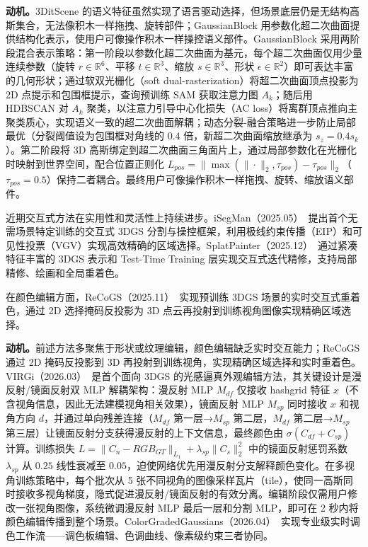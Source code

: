 \textbf{动机。}3DitScene 的语义特征虽然实现了语言驱动选择，但场景底层仍是无结构高斯集合，无法像积木一样拖拽、旋转部件；GaussianBlock 用参数化超二次曲面提供结构化表示，使用户可像操作积木一样操控语义部件。GaussianBlock 采用两阶段混合表示策略：第一阶段以参数化超二次曲面为基元，每个超二次曲面仅用少量连续参数（旋转 $r \in \mathbb{R}^6$、平移 $t \in \mathbb{R}^3$、缩放 $s \in \mathbb{R}^3$、形状 $\epsilon \in \mathbb{R}^2$）即可表达丰富的几何形状；通过软双光栅化（soft dual-rasterization）将超二次曲面顶点投影为 2D 点提示和包围框提示，查询预训练 SAM 获取注意力图 $A_k$；随后用 HDBSCAN 对 $A_k$ 聚类，以注意力引导中心化损失（AC loss）将离群顶点推向主聚类质心，实现语义一致的超二次曲面解耦；动态分裂-融合策略进一步防止局部最优（分裂阈值设为包围框对角线的 $0.4$ 倍，新超二次曲面缩放继承为 $s_z = 0.4s_k$）。第二阶段将 3D 高斯绑定到超二次曲面三角面片上，通过局部参数化在光栅化时映射到世界空间，配合位置正则化 $L_{pos} = \|\max(\|\cdot\|_2, \tau_{pos}) - \tau_{pos}\|_2$（$\tau_{pos}=0.5$）保持二者耦合。最终用户可像操作积木一样拖拽、旋转、缩放语义部件。

近期交互式方法在实用性和灵活性上持续进步。iSegMan（2025.05）~\cite{2505_11934}提出首个无需场景特定训练的交互式 3DGS 分割与操控框架，利用极线约束传播（EIP）和可见性投票（VGV）实现高效精确的区域选择。SplatPainter（2025.12）~\cite{2512_05354}通过紧凑特征丰富的 3DGS 表示和 Test-Time Training 层实现交互式迭代精修，支持局部精修、绘画和全局重着色。

在颜色编辑方面，ReCoGS（2025.11）~\cite{2511_18441}实现预训练 3DGS 场景的实时交互式重着色，通过 2D 选择掩码反投影为 3D 点云再投射到训练视角图像实现精确区域选择。

\textbf{动机。}前述方法多聚焦于形状或纹理编辑，颜色编辑缺乏实时交互能力；ReCoGS 通过 2D 掩码反投影到 3D 再投射到训练视角，实现精确区域选择和实时重着色。VIRGi（2026.03）~\cite{2603_02986}是首个面向 3DGS 的光感逼真外观编辑方法，其关键设计是漫反射/镜面反射双 MLP 解耦架构：漫反射 MLP $M_{df}$ 仅接收 hashgrid 特征 $x$（不含视角信息，因此无法建模视角相关效果），镜面反射 MLP $M_{sp}$ 同时接收 $x$ 和视角方向 $d$，并通过单向残差连接（$M_{df}$ 第一层→$M_{sp}$ 第二层，$M_{df}$ 第二层→$M_{sp}$ 第三层）让镜面反射分支获得漫反射的上下文信息，最终颜色由 $\sigma(C_{df} + C_{sp})$ 计算。训练损失 $L = \|C_n - RGB_{GT}\|_{L_1} + \lambda_{sp} \|C_s\|^2_2$ 中的镜面反射惩罚系数 $\lambda_{sp}$ 从 $0.25$ 线性衰减至 $0.05$，迫使网络优先用漫反射分支解释颜色变化。在多视角训练策略中，每个批次从 5 张不同视角的图像采样瓦片（tile），使同一高斯同时接收多视角梯度，隐式促进漫反射/镜面反射的有效分离。编辑阶段仅需用户修改一张视角图像，系统微调漫反射 MLP 最后一层和分割 MLP，即可在 2 秒内将颜色编辑传播到整个场景。ColorGradedGaussians（2026.04）~\cite{2604_01551}实现专业级实时调色工作流——调色板编辑、色调曲线、像素级约束三者协同。

